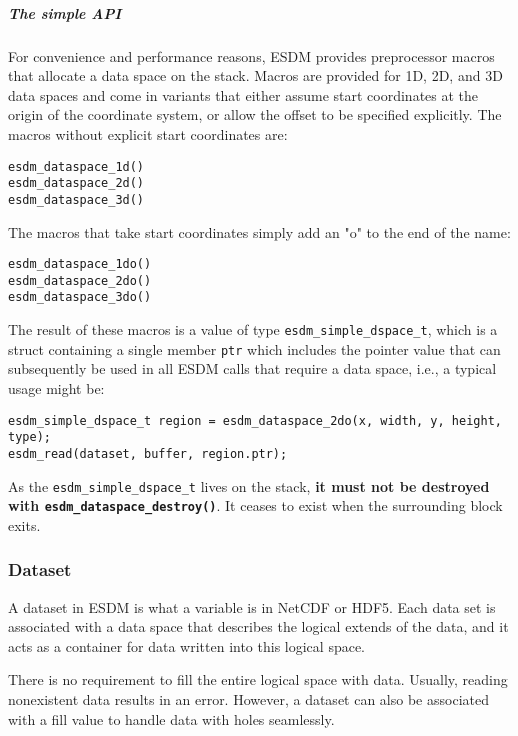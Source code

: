 \subparagraph{The simple API}

For convenience and performance reasons, ESDM provides preprocessor macros that allocate a data space on the stack. 
Macros are provided for 1D, 2D, and 3D data spaces and come in variants that either assume start coordinates at the origin of the coordinate system, or
allow the offset to be specified explicitly. 
The macros without explicit start coordinates are:

\begin{lstlisting}
esdm_dataspace_1d()
esdm_dataspace_2d()
esdm_dataspace_3d()
\end{lstlisting}

The macros that take start coordinates simply add an "o" to the end of
the name:

\begin{lstlisting}
esdm_dataspace_1do()
esdm_dataspace_2do()
esdm_dataspace_3do()
\end{lstlisting}

The result of these macros is a value of type \lstinline|esdm_simple_dspace_t|, which is a struct containing a single member \lstinline|ptr| which includes the pointer value that can subsequently be used in all ESDM calls that require a data space, i.e., a typical usage might be:

\begin{lstlisting}
esdm_simple_dspace_t region = esdm_dataspace_2do(x, width, y, height, type);
esdm_read(dataset, buffer, region.ptr);
\end{lstlisting}

As the \lstinline|esdm_simple_dspace_t| lives on the stack, \textbf{it must not be destroyed with \lstinline|esdm_dataspace_destroy()|}. 
It ceases to exist when the surrounding block exits.

\subsubsection{Dataset}
\label{sec:user-guides:dataset}

A dataset in ESDM is what a variable is in NetCDF or HDF5. 
Each data set is associated with a data space that describes the logical extends of the data, and it acts as a container for data written into this logical space.

There is no requirement to fill the entire logical space with data. 
Usually, reading nonexistent data results in an error. 
However, a dataset can also be associated with a fill value to handle data with holes seamlessly.

